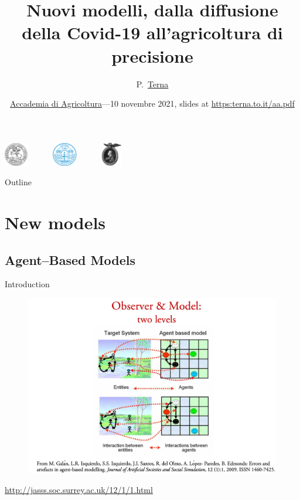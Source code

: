 \documentclass[9pt]{beamer}
\title[Nuovi modelli] %
{Nuovi modelli, dalla diffusione della Covid-19 all'agricoltura di precisione}
\author[] %
{P.~\href{https://terna.to.it}{Terna}\inst{1~2~3}  }
\institute[] %
{
  \inst{1}%
 University of Torino, Italy
  \and
 \inst{2}%
  Fondazione Collegio Carlo Alberto, Honorary Fellow, Italy
  \and
  \inst{3}%
  Accademia di Agricoltura, Torino, Italy
 }
\date[] %
{\href{http://www.accademiadiagricoltura.it}{Accademia di Agricoltura}---10 novembre  2021, slides at \url{https:terna.to.it/aa.pdf}}
\begin{document}
\begin{frame}

\includegraphics[width=0.08\textwidth]{logo2_unito.png}~~~~~~\includegraphics[width=0.08\textwidth]{CCA_Logo2.png}~~~~~~\includegraphics[width=0.07\textwidth]{A_agr.jpeg}


\titlepage


\end{frame}

\begin{frame}{Outline}

  \tableofcontents
\end{frame}

\section{New models}

\subsection{Agent--Based Models}

\begin{frame}{Introduction}

\begin{figure}[H]
\center
\includegraphics[scale=0.27]{abm1.png}
\label{abmPicture}
\end{figure}
\url{http://jasss.soc.surrey.ac.uk/12/1/1.html}

\end{frame}
\end{document}
